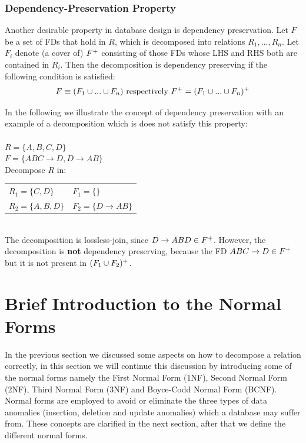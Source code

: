 \subsubsection{Dependency-Preservation Property}
Another desirable property in database design is dependency preservation. 
Let $F$ be a set of FDs that hold in $R$, which is decomposed into relations $R_1 ,..., R_n$.
Let $F_i$ denote (a cover of) $F\sp{+}$ consisting of those FDs whose LHS
and RHS both are contained in $R_i$. Then the decomposition is
dependency preserving if the following condition is satisfied: 
\begin{displaymath}
F \equiv (F_1 \cup ... \cup F_n ) \mbox{  respectively  } F\sp{+} = (F_1 \cup ... \cup F_n )\sp{+}
\end{displaymath}

In the following we illustrate the concept of dependency preservation with an example
of a decomposition which is does not satisfy this property: \\ \\
\indent $R = \{A, B, C, D\}$ \\
\indent $F = \{ABC \rightarrow D, D \rightarrow AB\}$ \\
\indent Decompose $R$ in: \\
\indent \begin{tabular}[h]{l l}
  $R_1 = \{C, D\}$  & $F_1 = \{ \}$ \\
  $R_2 = \{A,B,D\}$ & $F_2 = \{D \rightarrow AB \}$ \\
\end{tabular} \\

The decomposition is lossless-join, since $D \rightarrow ABD \in F\sp{+}$. However, 
the decomposition is \textbf{not} dependency preserving, because the FD $ABC \rightarrow D \in F\sp{+}$ but it is
not present in $(F_1 \cup F_2)\sp{+}$.

\section{Brief Introduction to the Normal Forms}
\label{sec:nfintro}
In the previous section we discussed some aspects on how to decompose a relation correctly, 
in this section we will continue this discussion by introducing some of the normal forms
namely the First Normal Form (1NF), Second Normal Form (2NF), Third Normal Form (3NF) and
Boyce-Codd Normal Form (BCNF). Normal forms are employed to avoid or eliminate 
the three types of data anomalies 
(insertion, deletion and update anomalies) which a database may suffer from. 
These concepts are clarified in the next section, after that we
define the different normal forms.

